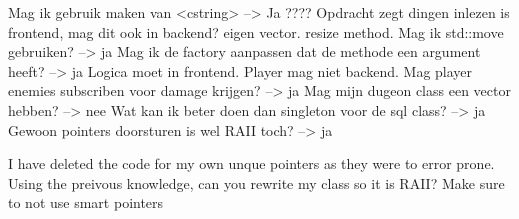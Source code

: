 Mag ik gebruik maken van <cstring> --> Ja
???? Opdracht zegt dingen inlezen is frontend, mag dit ook in backend?
eigen vector. resize method. Mag ik std::move gebruiken? --> ja
Mag ik de factory aanpassen dat de methode een argument heeft? --> ja
Logica moet in frontend. Player mag niet backend. Mag player enemies subscriben voor damage krijgen? --> ja
Mag mijn dugeon class een vector hebben? --> nee
Wat kan ik beter doen dan singleton voor de sql class? --> ja
Gewoon pointers doorsturen is wel RAII toch? --> ja

I have deleted the code for my own unque pointers as they were to error prone. Using the preivous knowledge, can you rewrite my class so it is RAII? Make sure to not use smart pointers